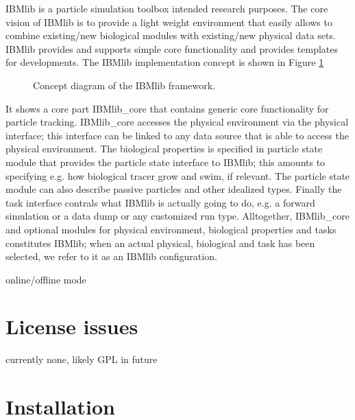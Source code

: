 IBMlib is a particle simulation toolbox intended research purposes.
The core vision of IBMlib is to provide a light weight environment
that easily allows to combine existing/new biological modules with 
existing/new physical data sets.
IBMlib provides and supports simple core functionality and provides
templates for developments.
The IBMlib implementation concept is shown in Figure \ref{IBMlib:concept}
\begin{figure}[p]   %
\begin{center}                                                  %
\end{center}                                                    %
\caption{Concept diagram of the IBMlib framework.}
\label{IBMlib:concept}
\end{figure}
It shows a core part IBMlib\_core that contains generic core functionality for
particle tracking. IBMlib\_core accesses the physical environment via the
physical interface; this interface can be linked to any data source that is
able to access the physical environment. The biological properties is specified in 
particle state module that provides the particle state interface to IBMlib; 
this amounts to specifying e.g. how biological tracer grow and swim, if relevant.
The particle state module can also describe passive particles and other 
idealized types. Finally the task interface contrals what IBMlib is actually going 
to do, e.g. a forward simulation or a data dump or any customized run type.
Alltogether, IBMlib\_core and optional modules for physical environment, biological 
properties and tasks constitutes IBMlib; when an actual physical, biological 
and task has been selected, we refer to it as an IBMlib configuration.

online/offline mode

\chapter{License issues}

currently none, likely GPL in future

\chapter{Installation}

